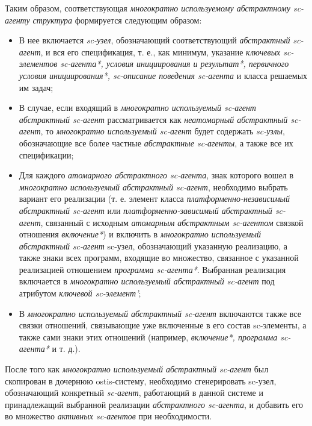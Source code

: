Таким образом, соответствующая \textit{многократно используемому абстрактному sc-агенту структура} формируется следующим образом:

\begin{itemize}
    \item В нее включается \textit{sc-узел}, обозначающий соответствующий \textit{абстрактный sc-агент}, и вся его спецификация, т. е., как минимум, указание \textit{ключевых sc-элементов sc-агента*, условия инициирования и результат*, первичного условия инициирования*, sc-описание поведения sc-агента} и класса решаемых им задач;
    \item В случае, если входящий в \textit{многократно используемый sc-агент абстрактный sc-агент} рассматривается как \textit{неатомарный абстрактный sc-агент}, то \textit{многократно используемый sc-агент} будет содержать \textit{sc-узлы}, обозначающие все более частные \textit{абстрактные sc-агенты}, а также все их спецификации;
    \item Для каждого \textit{атомарного абстрактного sc-агента}, знак которого вошел в \textit{многократно используемый абстрактный sc-агент}, необходимо выбрать вариант его реализации (т. е. элемент класса \textit{платформенно-независимый абстрактный sc-агент} или \textit{платформенно-зависимый абстрактный sc-агент}, связанный с исходным \textit{атомарным абстрактным sc-агентом} связкой отношения \textit{включение*}) и включить в \textit{многократно используемый абстрактный sc-агент} sc-узел, обозначающий указанную реализацию, а также знаки всех программ, входящие во множество, связанное с указанной реализацией отношением \textit{программа sc-агента*}. Выбранная реализация включается в \textit{многократно используемый абстрактный sc-агент} под атрибутом \textit{ключевой sc-элемент'};
    \item В \textit{многократно используемый абстрактный sc-агент} включаются также все связки отношений, связывающие уже включенные в его состав sc-элементы, а также сами знаки этих отношений (например, \textit{включение*, программа sc-агента*} и т. д.).
\end{itemize}

После того как \textit{многократно используемый абстрактный sc-агент} был скопирован в дочернюю ostis-систему, необходимо сгенерировать sc-узел, обозначающий конкретный \textit{sc-агент}, работающий в данной системе и принадлежащий выбранной реализации \textit{абстрактного sc-агента}, и добавить его во множество \textit{активных sc-агентов} при необходимости.

